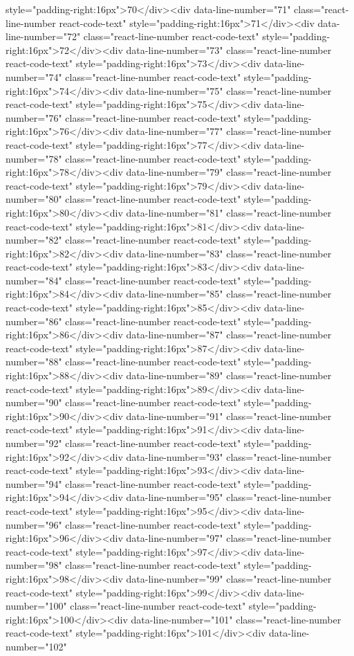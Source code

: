 {{{{{{{{{{{{{{{{{{{{{{{{{{{{{{{style="padding-right:16px">70</div><div data-line-number="71" class="react-line-number react-code-text" style="padding-right:16px">71</div><div data-line-number="72" class="react-line-number react-code-text" style="padding-right:16px">72</div><div data-line-number="73" class="react-line-number react-code-text" style="padding-right:16px">73</div><div data-line-number="74" class="react-line-number react-code-text" style="padding-right:16px">74</div><div data-line-number="75" class="react-line-number react-code-text" style="padding-right:16px">75</div><div data-line-number="76" class="react-line-number react-code-text" style="padding-right:16px">76</div><div data-line-number="77" class="react-line-number react-code-text" style="padding-right:16px">77</div><div data-line-number="78" class="react-line-number react-code-text" style="padding-right:16px">78</div><div data-line-number="79" class="react-line-number react-code-text" style="padding-right:16px">79</div><div data-line-number="80" class="react-line-number react-code-text" style="padding-right:16px">80</div><div data-line-number="81" class="react-line-number react-code-text" style="padding-right:16px">81</div><div data-line-number="82" class="react-line-number react-code-text" style="padding-right:16px">82</div><div data-line-number="83" class="react-line-number react-code-text" style="padding-right:16px">83</div><div data-line-number="84" class="react-line-number react-code-text" style="padding-right:16px">84</div><div data-line-number="85" class="react-line-number react-code-text" style="padding-right:16px">85</div><div data-line-number="86" class="react-line-number react-code-text" style="padding-right:16px">86</div><div data-line-number="87" class="react-line-number react-code-text" style="padding-right:16px">87</div><div data-line-number="88" class="react-line-number react-code-text" style="padding-right:16px">88</div><div data-line-number="89" class="react-line-number react-code-text" style="padding-right:16px">89</div><div data-line-number="90" class="react-line-number react-code-text" style="padding-right:16px">90</div><div data-line-number="91" class="react-line-number react-code-text" style="padding-right:16px">91</div><div data-line-number="92" class="react-line-number react-code-text" style="padding-right:16px">92</div><div data-line-number="93" class="react-line-number react-code-text" style="padding-right:16px">93</div><div data-line-number="94" class="react-line-number react-code-text" style="padding-right:16px">94</div><div data-line-number="95" class="react-line-number react-code-text" style="padding-right:16px">95</div><div data-line-number="96" class="react-line-number react-code-text" style="padding-right:16px">96</div><div data-line-number="97" class="react-line-number react-code-text" style="padding-right:16px">97</div><div data-line-number="98" class="react-line-number react-code-text" style="padding-right:16px">98</div><div data-line-number="99" class="react-line-number react-code-text" style="padding-right:16px">99</div><div data-line-number="100" class="react-line-number react-code-text" style="padding-right:16px">100</div><div data-line-number="101" class="react-line-number react-code-text" style="padding-right:16px">101</div><div data-line-number="102" }}}}}}}}}}}}}}}}}}}}}}}}}}}}}}}
